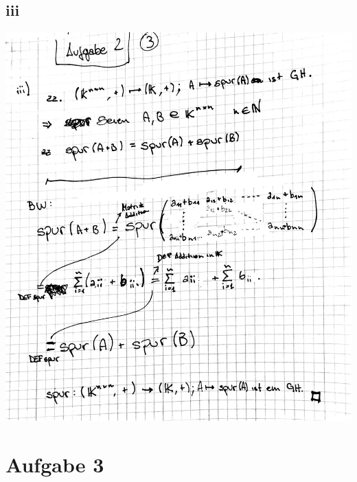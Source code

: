 \documentclass[10pt,a4paper]{article}
\begin{document}
\subsection{iii}
\includegraphics[width=\textwidth]{lat5a_4.jpg} 


\newpage
\section{Aufgabe 3}
\end{document}

